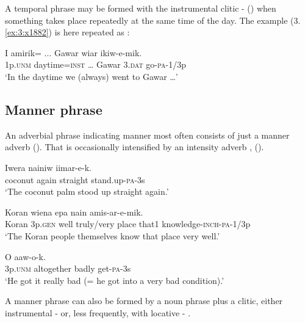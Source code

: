 A temporal phrase may be formed with the instrumental clitic - () when something takes place repeatedly at the same time of the day. The example (3.\ref{ex:3:x1882}) is here repeated as :

\ea%
\label{ex:4:x1907}
\gll I  amirik=  ...  Gawar  wiar  ikiw-e-mik. \\
  1p.\textsc{unm}  daytime=\textsc{inst}  {\dots}  Gawar  3.\textsc{dat}  go-\textsc{pa}-1/3p    \\
\glt`In the daytime we (always) went to Gawar {\dots}'
\z

\subsection{Manner phrase} \label{sec:4.6.3}
{}
An adverbial phrase indicating manner most often consists of just a manner adverb  ().  That is occasionally intensified by an intensity adverb , (). 

\ea%
\label{ex:4:x880}
\gll Iwera  nainiw    iimar-e-k. \\
  coconut  again  straight  stand.up-\textsc{pa}-3s    \\
\glt`The coconut palm stood up straight again.'
\z

\ea%
\label{ex:4:x879}
\gll Koran  wiena     epa  nain amis-ar-e-mik.\\
  Koran  3p.\textsc{gen}  well  truly/very  place  that1   knowledge-\textsc{inch}-\textsc{pa}-1/3p\\
\glt`The Koran people themselves know that place very well.'
\z

\ea%
\label{ex:4:x881}
\gll O     aaw-o-k.  \\
  3p.\textsc{unm}  altogether  badly  get-\textsc{pa}-3s    \\
\glt`He got it really bad (= he got into a very bad condition).'
\z

A manner phrase can also be formed by a noun phrase plus a clitic, either instrumental \nobreakdash-  or, less frequently, with locative - .  

